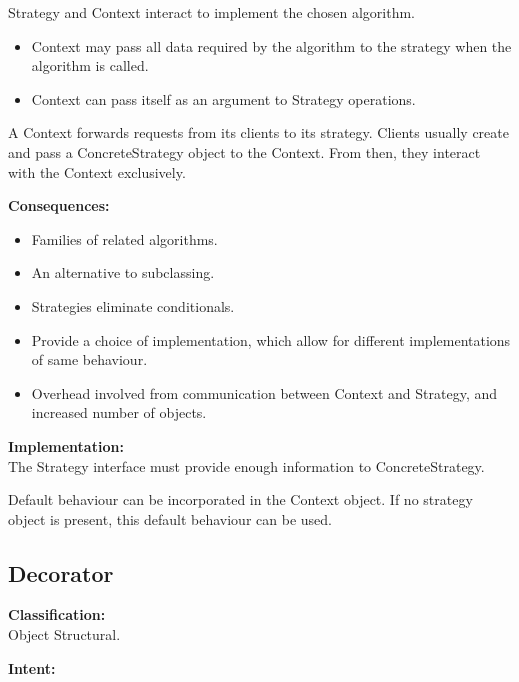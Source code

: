 Strategy and Context interact to implement the chosen algorithm.

\begin{itemize}
\item Context may pass all data required by the algorithm to the strategy when the algorithm is called.
\item Context can pass itself as an argument to Strategy operations.
\end{itemize}

A Context forwards requests from its clients to its strategy. Clients usually create and pass a ConcreteStrategy object to the Context. From then, they interact with the Context exclusively.

\vspace{12pt}\textbf{Consequences:}\\

\begin{itemize}
\item Families of related algorithms.
\item An alternative to subclassing.
\item Strategies eliminate conditionals.
\item Provide a choice of implementation, which allow for different implementations of same behaviour.
\item Overhead involved from communication between Context and Strategy, and increased number of objects.
\end{itemize}

\vspace{12pt}\textbf{Implementation:}\\

The Strategy interface must provide enough information to ConcreteStrategy.

Default behaviour can be incorporated in the Context object. If no strategy object is present, this default behaviour can be used.

\subsection{Decorator}

\vspace{12pt}\textbf{Classification:}\\

Object Structural.



\vspace{12pt}\textbf{Intent:}\\

